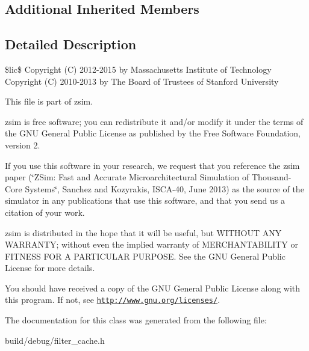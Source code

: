 \subsection*{Additional Inherited Members}


\subsection{Detailed Description}
\$lic\$ Copyright (C) 2012-\/2015 by Massachusetts Institute of Technology Copyright (C) 2010-\/2013 by The Board of Trustees of Stanford University

This file is part of zsim.

zsim is free software; you can redistribute it and/or modify it under the terms of the G\-N\-U General Public License as published by the Free Software Foundation, version 2.

If you use this software in your research, we request that you reference the zsim paper (\char`\"{}\-Z\-Sim\-: Fast and Accurate Microarchitectural Simulation of
\-Thousand-\/\-Core Systems\char`\"{}, Sanchez and Kozyrakis, I\-S\-C\-A-\/40, June 2013) as the source of the simulator in any publications that use this software, and that you send us a citation of your work.

zsim is distributed in the hope that it will be useful, but W\-I\-T\-H\-O\-U\-T A\-N\-Y W\-A\-R\-R\-A\-N\-T\-Y; without even the implied warranty of M\-E\-R\-C\-H\-A\-N\-T\-A\-B\-I\-L\-I\-T\-Y or F\-I\-T\-N\-E\-S\-S F\-O\-R A P\-A\-R\-T\-I\-C\-U\-L\-A\-R P\-U\-R\-P\-O\-S\-E. See the G\-N\-U General Public License for more details.

You should have received a copy of the G\-N\-U General Public License along with this program. If not, see \href{http://www.gnu.org/licenses/}{\tt http\-://www.\-gnu.\-org/licenses/}. 

The documentation for this class was generated from the following file\-:\begin{DoxyCompactItemize}
\item 
build/debug/filter\-\_\-cache.\-h\end{DoxyCompactItemize}
